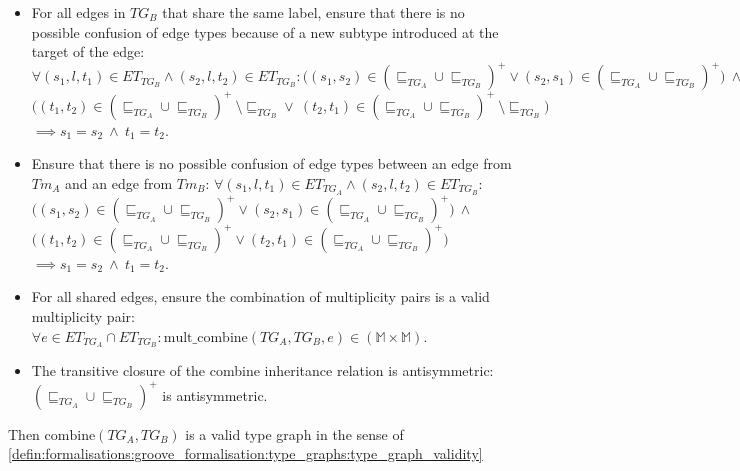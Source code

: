 \begin{thm}
\begin{itemize}
    \item For all edges in $TG_B$ that share the same label, ensure that there is no possible confusion of edge types because of a new subtype introduced at the target of the edge: $\forall (s_1, l, t_1) \in ET_{TG_B} \land (s_2, l, t_2) \in ET_{TG_B}\!: \big((s_1, s_2) \in (\sqsubseteq_{TG_A} \cup \sqsubseteq_{TG_B})^+ \lor (s_2, s_1) \in (\sqsubseteq_{TG_A} \cup \sqsubseteq_{TG_B})^+\big)\ \land$\\$\big((t_1, t_2) \in (\sqsubseteq_{TG_A} \cup \sqsubseteq_{TG_B})^+\ \setminus \sqsubseteq_{TG_{B}}\!\! \lor\ (t_2, t_1) \in (\sqsubseteq_{TG_A} \cup \sqsubseteq_{TG_B})^+\ \setminus \sqsubseteq_{TG_{B}}\!\!\big)$\\$\implies s_1 = s_2\ \land\ t_1 = t_2$.
    \item Ensure that there is no possible confusion of edge types between an edge from $Tm_A$ and an edge from $Tm_B$: $\forall (s_1, l, t_1) \in ET_{TG_A} \land (s_2, l, t_2) \in ET_{TG_B}\!:$\\$\big((s_1, s_2) \in (\sqsubseteq_{TG_A} \cup \sqsubseteq_{TG_B})^+ \lor (s_2, s_1) \in (\sqsubseteq_{TG_A} \cup \sqsubseteq_{TG_B})^+\big)\ \land$\\$\big((t_1, t_2) \in (\sqsubseteq_{TG_A} \cup \sqsubseteq_{TG_B})^+ \lor (t_2, t_1) \in (\sqsubseteq_{TG_A} \cup \sqsubseteq_{TG_B})^+\big)$\\$\implies s_1 = s_2\ \land\ t_1 = t_2$.
    \item For all shared edges, ensure the combination of multiplicity pairs is a valid multiplicity pair: $\forall e \in ET_{TG_A} \cap ET_{TG_B}\!: \mathrm{mult\_\!combine}(TG_{A}, TG_{B}, e) \in (\mathbb{M} \times \mathbb{M})$.
    \item The transitive closure of the combine inheritance relation is antisymmetric: $(\sqsubseteq_{TG_A} \cup \sqsubseteq_{TG_B})^+$ is antisymmetric.
\end{itemize}

Then $\mathrm{combine}(TG_A, TG_B)$ is a valid type graph in the sense of \cref{defin:formalisations:groove_formalisation:type_graphs:type_graph_validity}
\end{thm}

